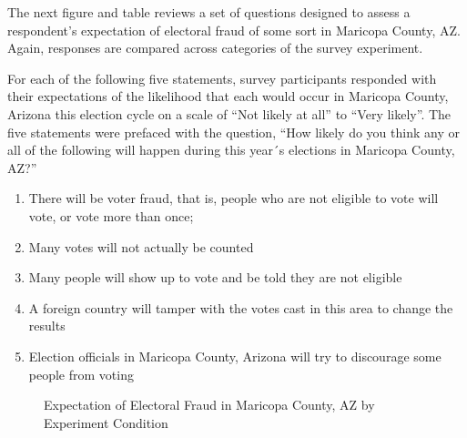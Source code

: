\documentclass[
  11pt,
  a4paper,
]{article}
\providecommand{\tightlist}{%
  \setlength{\itemsep}{0pt}\setlength{\parskip}{0pt}}\usepackage{longtable,booktabs,array}
\begin{document}
The next figure and table reviews a set of questions designed to assess
a respondent's expectation of electoral fraud of some sort in Maricopa
County, AZ. Again, responses are compared across categories of the
survey experiment.

For each of the following five statements, survey participants responded
with their expectations of the likelihood that each would occur in
Maricopa County, Arizona this election cycle on a scale of ``Not likely
at all'' to ``Very likely''. The five statements were prefaced with the
question, ``How likely do you think any or all of the following will
happen during this year´s elections in Maricopa County, AZ?''

\begin{enumerate}
\def\labelenumi{\arabic{enumi}.}
\tightlist
\item
  There will be voter fraud, that is, people who are not eligible to
  vote will vote, or vote more than once;
\item
  Many votes will not actually be counted
\item
  Many people will show up to vote and be told they are not eligible
\item
  A foreign country will tamper with the votes cast in this area to
  change the results
\item
  Election officials in Maricopa County, Arizona will try to discourage
  some people from voting
\end{enumerate}

\begin{figure}


\caption{\label{fig-q28}Expectation of Electoral Fraud in Maricopa
County, AZ by Experiment Condition}

\end{figure}%
\end{document}
